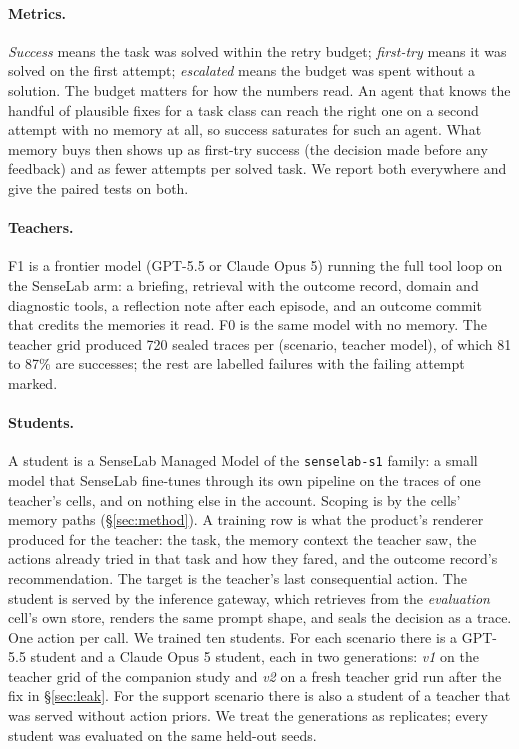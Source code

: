 \documentclass[11pt]{article}
\newcommand{\arm}[1]{\texttt{#1}}
\newcommand{\cond}[1]{\textsf{#1}}
\begin{document}
\paragraph{Metrics.} \emph{Success} means the task was solved within the retry budget;
\emph{first-try} means it was solved on the first attempt; \emph{escalated} means the
budget was spent without a solution. The budget matters for how the numbers read. An agent
that knows the handful of plausible fixes for a task class can reach the right one on a
second attempt with no memory at all, so success saturates for such an agent. What memory
buys then shows up as first-try success (the decision made before any feedback) and as
fewer attempts per solved task. We report both everywhere and give the paired tests on both.

\paragraph{Teachers.} \cond{F1} is a frontier model (GPT-5.5 or Claude Opus 5) running the
full tool loop on the SenseLab arm: a briefing, retrieval with the outcome record, domain
and diagnostic tools, a reflection note after each episode, and an outcome commit that
credits the memories it read. \cond{F0} is the same model with no memory. The teacher grid
produced 720 sealed traces per (scenario, teacher model), of which 81 to 87\% are successes;
the rest are labelled failures with the failing attempt marked.

\paragraph{Students.} A student is a SenseLab Managed Model of the \arm{senselab-s1}
family: a small model that SenseLab fine-tunes through its own pipeline on the traces of one
teacher's cells, and on nothing else in the account. Scoping is by the cells' memory paths
(\S\ref{sec:method}). A training row is what the product's renderer produced for the
teacher: the task, the memory context the teacher saw, the actions already tried in that
task and how they fared, and the outcome record's recommendation. The target is the
teacher's last consequential action. The student is served by the inference gateway, which
retrieves from the \emph{evaluation} cell's own store, renders the same prompt shape, and
seals the decision as a trace. One action per call. We trained ten students. For each
scenario there is a GPT-5.5 student and a Claude Opus 5 student, each in two generations:
\emph{v1} on the teacher grid of the companion study and \emph{v2} on a fresh teacher grid
run after the fix in \S\ref{sec:leak}. For the support scenario there is also a student of a
teacher that was served without action priors. We treat the generations as replicates;
every student was evaluated on the same held-out seeds.
\end{document}
